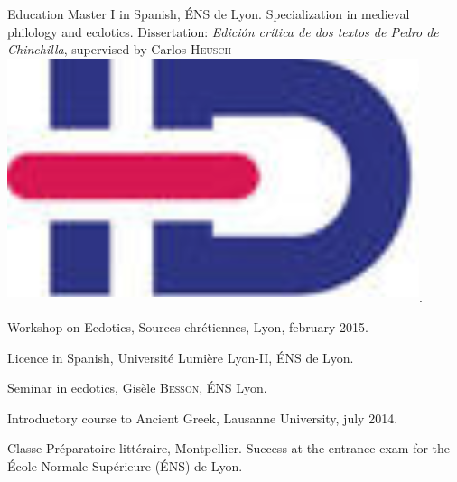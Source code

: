 \begin{rubric}{Education}
                                \entry*[2014-2015]
                            Master I in Spanish, ÉNS de Lyon. Specialization in
                        medieval philology and ecdotics. Dissertation:
                        \textit{Edición crítica de dos textos de Pedro de
                        Chinchilla}, supervised by Carlos
                        \textsc{Heusch}\href{https://www.idref.fr/055838413}{\textsuperscript{\includegraphics[scale=0.025]{img/idref.png}}}.
                    
                                \entry*
                            Workshop on Ecdotics, Sources chrétiennes, Lyon,
                        february 2015.
                    
                                \entry*[2013-2014]
                            Licence in Spanish, Université Lumière Lyon-II, ÉNS
                        de Lyon.
                    
                                \entry*
                            Seminar in ecdotics, Gisèle
                        \textsc{Besson}, ÉNS Lyon.
                    
                                \entry*
                            Introductory course to Ancient Greek, Lausanne
                        University, july 2014.
                    
                                \entry*[2011-2013]
                            Classe Préparatoire littéraire, Montpellier.
                        Success at the entrance exam for the École Normale
                        Supérieure (ÉNS) de Lyon.
                    \end{rubric}





